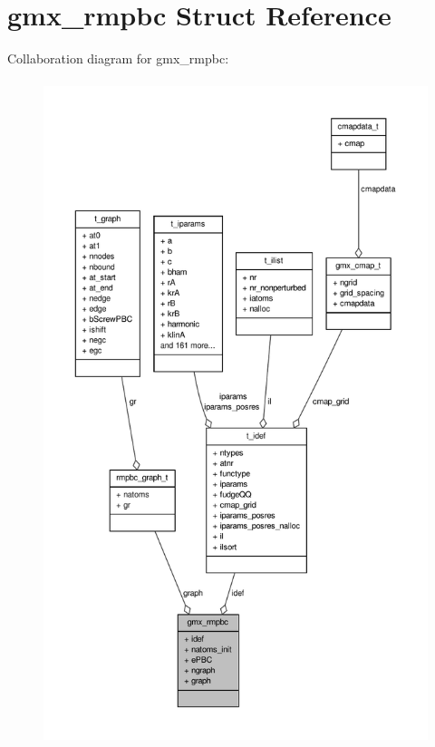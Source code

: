 \hypertarget{structgmx__rmpbc}{\section{gmx\-\_\-rmpbc \-Struct \-Reference}
\label{structgmx__rmpbc}
}


\-Collaboration diagram for gmx\-\_\-rmpbc\-:
\nopagebreak
\begin{figure}[H]
\begin{center}
\leavevmode
\includegraphics[height=550pt]{structgmx__rmpbc__coll__graph}
\end{center}
\end{figure}
